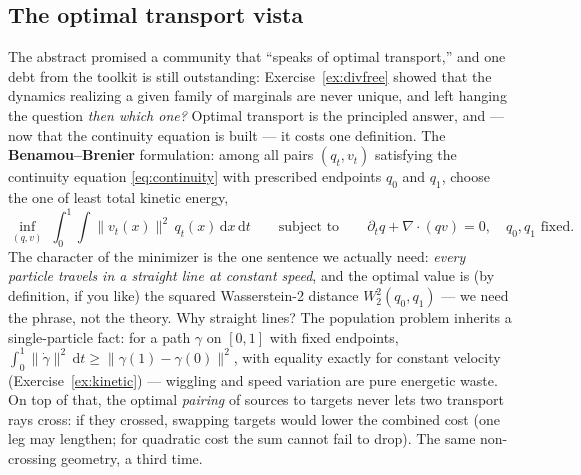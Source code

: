 \documentclass[10pt,a4paper]{article}
\newcommand{\dd}{\mathrm{d}}
\begin{document}
\subsection{The optimal transport vista}
\label{sec:ot}

The abstract promised a community that ``speaks of optimal transport,''
and one debt from the toolkit is still outstanding:
Exercise~\ref{ex:divfree} showed that the dynamics realizing a given
family of marginals are never unique, and left hanging the question
\emph{then which one?} Optimal transport is the principled answer, and
--- now that the continuity equation is built --- it costs one
definition. The \textbf{Benamou--Brenier} formulation: among all pairs
$(q_t, v_t)$ satisfying the continuity equation \eqref{eq:continuity}
with prescribed endpoints $q_0$ and $q_1$, choose the one of least total
kinetic energy,
\begin{equation}
\inf_{(q, v)}\; \int_0^1 \!\!\int \big\| v_t(x) \big\|^2\, q_t(x)\,
\dd x\, \dd t
\qquad \text{subject to} \qquad
\partial_t q + \nabla\!\cdot\!(q v) = 0,\quad
q_0, q_1 \text{ fixed.}
\label{eq:bb}
\end{equation}
The character of the minimizer is the one sentence we actually need:
\emph{every particle travels in a straight line at constant speed}, and
the optimal value is (by definition, if you like) the squared
Wasserstein-2 distance $W_2^2(q_0, q_1)$ --- we need the phrase, not the
theory. Why straight lines? The population problem inherits a
single-particle fact: for a path $\gamma$ on $[0,1]$ with fixed
endpoints, $\int_0^1 \|\dot\gamma\|^2\, \dd t \ge
\|\gamma(1) - \gamma(0)\|^2$, with equality exactly for constant
velocity (Exercise~\ref{ex:kinetic}) --- wiggling and speed variation
are pure energetic waste. On top of that, the optimal \emph{pairing} of
sources to targets never lets two transport rays cross: if they crossed,
swapping targets would lower the combined cost (one leg may lengthen;
for quadratic cost the sum cannot fail to drop). The same non-crossing
geometry, a third time.
\end{document}

